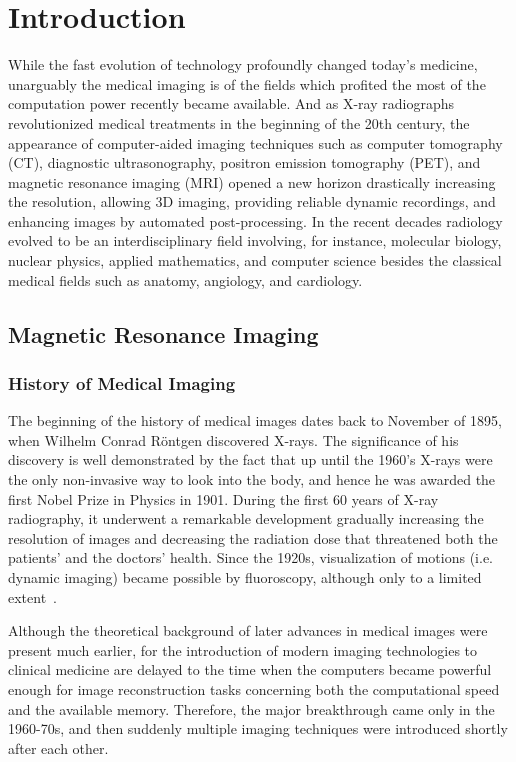 \chapter{Introduction}\label{chapter:introduction}

While the fast evolution of technology profoundly changed today's medicine, unarguably the medical imaging is of the fields which profited the most of the computation power recently became available. And as X-ray radiographs revolutionized medical treatments in the beginning of the 20th century,  the appearance of computer-aided imaging techniques such as computer tomography (CT), diagnostic ultrasonography, positron emission tomography (PET), and magnetic resonance imaging (MRI) opened a new horizon drastically increasing the resolution, allowing 3D imaging, providing reliable dynamic recordings, and enhancing images by automated post-processing. In the recent decades radiology evolved to be an interdisciplinary field involving, for instance, molecular biology, nuclear physics, applied mathematics, and computer science besides the classical medical fields such as anatomy, angiology, and cardiology.

\section{Magnetic Resonance Imaging}

\subsection{History of Medical Imaging}
The beginning of the history of medical images dates back to November of 1895, when Wilhelm Conrad Röntgen discovered X-rays. The significance of his discovery is well demonstrated by the fact that up until the 1960's X-rays were the only non-invasive way to look into the body, and hence he was awarded the first Nobel Prize in Physics in 1901. During the first 60 years of X-ray radiography, it underwent a remarkable development gradually increasing the resolution of images and decreasing the radiation dose that threatened both the patients' and the doctors' health. Since the 1920s, visualization of motions (i.e. dynamic imaging) became possible by fluoroscopy, although only to a limited extent~\cite{bradley_history_2008}.

Although the theoretical background of later advances in medical images were present much earlier, for the introduction of modern imaging technologies to clinical medicine are delayed to the time when the computers became powerful enough for image reconstruction tasks concerning both the computational speed and the available memory. Therefore, the major breakthrough came only in the 1960-70s, and then suddenly multiple imaging techniques were introduced shortly after each other.

